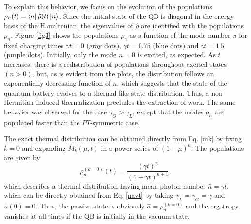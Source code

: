 \documentclass[%
reprint,
superscriptaddress,
amsmath,amssymb,
aps,
pra,
]{revtex4-2}
\begin{document}
To explain this behavior, we focus on the evolution of the populations $\rho_n(t) = \bra{n}\hat{\rho}(t)\ket{n}$. Since the initial state of the QB is diagonal in the energy basis of the Hamiltonian, the eigenvalues of $\hat{\rho}$ are identified with the populations $\rho_n$. Figure \ref{fig3} shows the populations $\rho_n$ as a function of the mode number $n$ for fixed charging times $\gamma t = 0$ (gray dots), $\gamma t = 0.75$ (blue dots) and $\gamma t = 1.5$ (purple dots). Initially, only the mode $n = 0$ is excited, as expected. As $t$ increases, there is a redistribution of populations throughout excited states $(n>0)$, but, as is evident from the plots, the distribution follows an exponentially decreasing function of $n$, which suggests that the state of the quantum battery evolves to a thermal-like state distribution. Thus, a non-Hermitian-induced thermalization precludes the extraction of work. The same behavior was observed for the case $\gamma_G > \gamma_L$, except that the modes $\rho_n$ are populated faster than the $PT$-symmetric case.

The exact thermal distribution can be obtained directly from Eq. \eqref{mk} by fixing $k = 0$ and expanding $M_k(\mu,t)$ in a power series of $(1-\mu)^n$. The populations are given by
\begin{equation}
    \rho^{(k=0)}_n (t) = \frac{(\gamma t)^{n}}{(1 + \gamma t)^{n+1}},
\end{equation}
which describes a thermal distribution having mean photon number $\bar{n} = \gamma t$, which can be directly obtained from Eq. \eqref{navt} by taking $\gamma_L = \gamma_G = \gamma$ and $\bar{n}(0) = 0$. Thus, the passive state is obviously $\hat{\sigma} = \rho_n^{(k=0)}$ and the ergotropy vanishes at all times if the QB is initially in the vacuum state.
\end{document}
